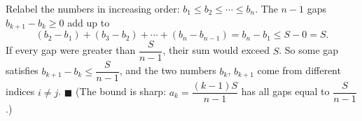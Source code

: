 Relabel the numbers in increasing order: $b_1\le b_2\le\cdots\le b_n$. The $n-1$ gaps $b_{k+1}-b_k\ge0$ add up to
\[
(b_2-b_1)+(b_3-b_2)+\cdots+(b_n-b_{n-1})=b_n-b_1\le S-0=S .
\]
If every gap were greater than $\dfrac{S}{n-1}$, their sum would exceed $S$. So some gap satisfies $b_{k+1}-b_k\le\dfrac{S}{n-1}$, and the two numbers $b_k$, $b_{k+1}$ come from different indices $i\ne j$. $\blacksquare$ (The bound is sharp: $a_k=\dfrac{(k-1)S}{n-1}$ has all gaps equal to $\dfrac{S}{n-1}$.)
